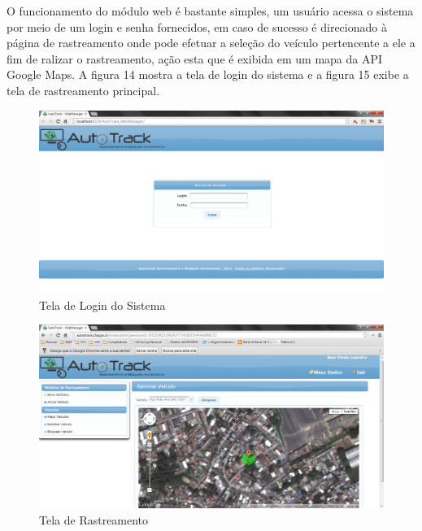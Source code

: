 O funcionamento do módulo web é bastante simples, um usuário acessa o sistema por meio de um login e senha fornecidos, em caso de sucesso é direcionado à página de rastreamento onde pode efetuar a seleção do veículo pertencente a ele a fim de ralizar o rastreamento, ação esta que é exibida em um mapa da API Google Maps. A figura 14 mostra a tela de login do sistema e a figura 15 exibe a tela de rastreamento principal.

\begin{figure}[!htb]
	\centering
	\includegraphics[width=15.00cm\textwidth]{figures/webmanager_login.png}
	\caption{Tela de Login do Sistema}
	\label{Figura 14}
\end{figure}

\begin{figure}[!htb]
	\centering
	\includegraphics[width=15.00cm\textwidth]{figures/webmanager_rastrear.png}
	\caption{Tela de Rastreamento}
	\label{Figura 15}
\end{figure}

\hfill

